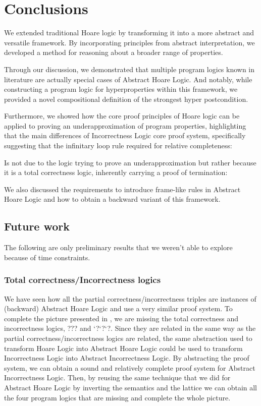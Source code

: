 \chapter{Conclusions}

We extended traditional Hoare logic by transforming it into a more abstract and
versatile framework. By incorporating principles from abstract interpretation,
we developed a method for reasoning about a broader range of properties.

Through our discussion, we demonstrated that multiple program logics known in
literature are actually special cases of Abstract Hoare Logic. And notably, 
while constructing a program logic for hyperproperties within this framework,
we provided a novel compositional definition of the strongest hyper
postcondition.

Furthermore, we showed how the core proof principles of Hoare logic can be
applied to proving an underapproximation of program properties, highlighting
that the main differences of Incorrectness Logic core proof system, specifically 
suggesting that the infinitary loop rule required for relative completeness:

\begin{prooftree}
\end{prooftree}

Is not due to the logic trying to prove an underapproximation but rather
because it is a total correctness logic, inherently carrying a proof of
termination:


We also discussed the requirements to introduce frame-like rules in Abstract
Hoare Logic and how to obtain a backward variant of this framework. 

\section{Future work}
The following are only preliminary results that we weren't able to explore
because of time constraints.

\subsection{Total correctness/Incorrectness logics}
We have seen how all the partial correctness/incorrectness triples are
instances of (backward) Abstract Hoare Logic and use a very similar proof
system. To complete the picture presented in \cite{Zhang22}, we are missing the
total correctness and incorrectness logics, ??? and `?`?`?. Since they are 
related in the same way as the partial correctness/incorrectness logics are 
related, the same abstraction used to transform Hoare Logic into Abstract Hoare 
Logic could be used to transform Incorrectness Logic \cite{Moller21} into 
Abstract Incorrectness Logic. By abstracting the proof system, we can obtain a 
sound and relatively complete proof system for Abstract Incorrectness Logic. 
Then, by reusing the same technique that we did for Abstract Hoare Logic by 
inverting the semantics and the lattice we can obtain all the four program 
logics that are missing and complete the whole picture.

